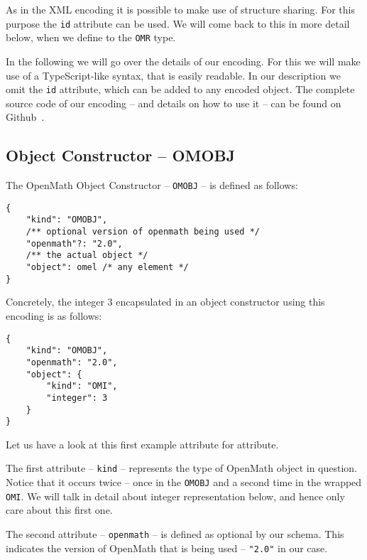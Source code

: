 As in the XML encoding it is possible to make use of structure sharing.  For this purpose
the \texttt{id} attribute can be used.  We will come back to this in more detail below,
when we define to the \texttt{OMR} type.

In the following we will go over the details of our encoding. 
For this we will make use of a TypeScript-like syntax, that is easily readable. 
In our description we omit the \texttt{id} attribute, which can be added to any encoded object. 
The complete source code of our encoding -- and details on how to use it -- can be found on Github~\cite{URL:openmathjson:github}. 

\subsection{Object Constructor -- OMOBJ}

The OpenMath Object Constructor -- \texttt{OMOBJ} -- is defined as follows:
\\\begin{minipage}{\linewidth}
\begin{lstlisting}
{
    "kind": "OMOBJ",
    /** optional version of openmath being used */
    "openmath"?: "2.0",
    /** the actual object */
    "object": omel /* any element */
}
\end{lstlisting}
\end{minipage}
Concretely, the integer 3 encapsulated in an object constructor using this encoding is as follows:
\\\begin{minipage}{\linewidth}
\begin{lstlisting}
{
    "kind": "OMOBJ",
    "openmath": "2.0",
    "object": {
        "kind": "OMI", 
        "integer": 3
    }
}
\end{lstlisting}\end{minipage}

Let us have a look at this first example attribute for attribute. 

The first attribute -- \texttt{kind} -- represents the type of OpenMath object in question. 
Notice that it occurs twice -- once in the \texttt{OMOBJ} and a second time in the wrapped \texttt{OMI}. 
We will talk in detail about integer representation below, and hence only care about this first one. 

The second attribute -- \texttt{openmath} -- is defined as optional by our schema. 
This indicates the version of OpenMath that is being used -- \lstinline{"2.0"} in our case. 

